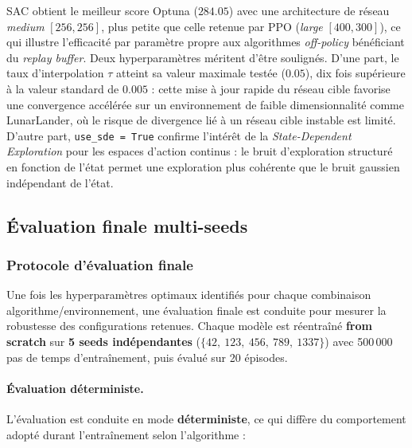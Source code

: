 \medskip
 
SAC obtient le meilleur score Optuna ($284.05$) avec une architecture de
réseau \textit{medium} $[256, 256]$, plus petite que celle retenue par PPO
(\textit{large} $[400, 300]$), ce qui illustre l'efficacité par paramètre
propre aux algorithmes \textit{off-policy} bénéficiant du \textit{replay
buffer}. Deux hyperparamètres méritent d'être soulignés. D'une part,
le taux d'interpolation $\tau$ atteint sa valeur maximale testée ($0.05$), dix fois supérieure à la valeur standard de $0.005$ \parencite{haarnojaSoftActorCriticOffPolicy2018} : cette mise à jour rapide
du réseau cible favorise une convergence accélérée sur un environnement de
faible dimensionnalité comme LunarLander, où le risque de divergence lié à
un réseau cible instable est limité. D'autre part, \texttt{use\_sde = True}
confirme l'intérêt de la \textit{State-Dependent Exploration} pour les espaces
d'action continus : le bruit d'exploration structuré en fonction de l'état
permet une exploration plus cohérente que le bruit gaussien indépendant de l'état.

\subsection{Évaluation finale multi-seeds}
\label{sec:eval_finale}

\subsubsection{Protocole d'évaluation finale}


Une fois les hyperparamètres optimaux identifiés pour chaque combinaison
algorithme/environnement, une évaluation finale est conduite pour mesurer la
robustesse des configurations retenues. Chaque modèle est réentraîné
\textbf{from scratch} sur \textbf{5 seeds indépendantes}
($\{42,\ 123,\ 456,\ 789,\ 1337\}$) avec 500\,000 pas de temps
d'entraînement, puis évalué sur 20 épisodes.

\paragraph{Évaluation déterministe.}
L'évaluation est conduite en mode \textbf{déterministe}, ce qui diffère du
comportement adopté durant l'entraînement selon l'algorithme :

